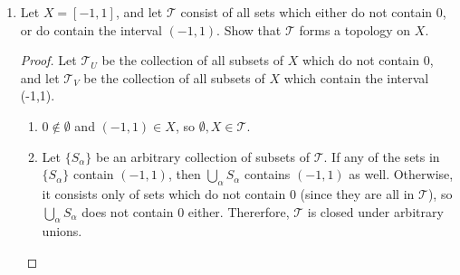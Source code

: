 \documentclass[letterpaper]{article}
\newcommand{\T}{\mathcal{T}}
\begin{document}
\begin{enumerate}
\begin{proof}\textbf{(ii)} Let $S$ be any subset of $\T$, and let $B = \{x:(x,\infty) \in S\}$. Then, since $\T$ contains all sets of the form $(a,\infty)$ with $a\geq 0$, it suffices to show that 
$$\bigcup S = (\inf(B),\infty).$$
$B$ is bounded below by $0$, so $\inf(B) \geq 0$ must exist.

$\subset$: For every $x \in B$ such that $x\neq \inf(B)$, $\inf(B) < x < \infty$. Therefore, every set in $S$ is a subset of $(\inf(B),\infty)$, so $\bigcup S \subset (\inf(B),\infty).$

$\supset$: Let $x \in (\inf(B),\infty)$; that is, $0 <\inf(B) < x$. If $\inf(B) \in B$, then $x \in (\inf(B),\infty) \subset \bigcup S$ and we are done. However, if $\inf(B) \not\in B$, then $\inf(B)$ must be a limit point of $B$, so every neighborhood of $\inf(B)$ contains an element of $B$ distinct from $\inf(B)$. Let $\delta = \frac{x-\inf(B)}{2}$, and consider the neighborhood $(\inf(B)-\delta, \inf(B)+\delta)$. Call $b$ the element of $B$ distinct from $\inf(B)$, and we find that $b < x$, so $x \in (b,\infty) \subset \bigcup S$.
\end{proof}

\begin{proof}\textbf{(iii)} Let $U, V \in \T$. In the trivial case where either set is empty, then $U \cap V = \emptyset$, and we are done. There is also another trivial case where $U=X$ and $V=X$. In this case, $U \cap V = X$, and we are done. So suppose $U$ and $V$ are nonempty sets, at least one of which is distinct from $X$; and let $u=\inf(U)$ and $v=\inf(V)$. Then, 
$$U \cap V= (\max(u,v),\infty),$$
which is a set of the form $(a,\infty)$, so $(\max(u,v),\infty) \in \T$.
\end{proof}

\item Let $X = [-1,1]$, and let $\T$ consist of all sets which either do not contain 0, or do contain the interval $(-1,1)$. Show that $\T$ forms a topology on $X$.

\begin{proof}Let $\T_U$ be the collection of all subsets of $X$ which do not contain 0, and let $\T_V$ be the collection of all subsets of $X$ which contain the interval (-1,1). 
\begin{enumerate}[label=(\roman*)]
\item $0 \not\in \emptyset$ and $(-1,1)\in X$, so $\emptyset, X \in \T$. 

\item Let $\{S_\alpha\}$ be an arbitrary collection of subsets of $\T$. If any of the sets in $\{S_\alpha\}$ contain $(-1,1)$, then $\bigcup_\alpha S_\alpha$ contains $(-1,1)$ as well. Otherwise, it consists only of sets which do not contain 0 (since they are all in $\T$), so $\bigcup_\alpha S_\alpha$ does not contain 0 either. Thererfore, $\T$ is closed under arbitrary unions.


\end{enumerate}
\end{proof}
\end{enumerate}
\end{document}
